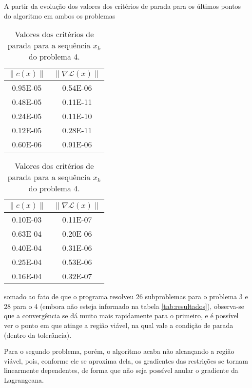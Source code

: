 	A partir da evolução dos valores dos critérios de parada para os últimos pontos
	do algoritmo em ambos os problemas
	\begin{table}[h!]
		\centering
		\begin{minipage}{.45\linewidth}
			\centering
			\begin{tabular}{cc}
				$\| c(x) \|$ & $\| \nabla \mathcal{L}(x) \|$ \\
				\hline
				0.95E-05 &   0.54E-06 \\
				0.48E-05 &   0.11E-11 \\
				0.24E-05 &   0.11E-10 \\
				0.12E-05 &   0.28E-11 \\
				0.60E-06 &   0.91E-06 \\
			\end{tabular}
			\caption{Valores dos critérios de parada para a sequência $x_k$ do problema 3.}
		\end{minipage}%
		\hspace{0.1\linewidth}%
		\begin{minipage}[r]{.45\linewidth}
			\centering
			\begin{tabular}{cc}
				$\| c(x) \|$ & $\| \nabla \mathcal{L}(x) \|$ \\
				\hline
				0.10E-03 &   0.11E-07 \\
				0.63E-04 &   0.20E-06 \\
				0.40E-04 &   0.31E-06 \\
				0.25E-04 &   0.53E-06 \\
				0.16E-04 &   0.32E-07 \\
			\end{tabular}
			\caption{Valores dos critérios de parada para a sequência $x_k$ do problema 4.}
		\end{minipage}
	\end{table}

	somado ao fato de que o programa resolveu 26 subproblemas para o problema 3 e
	28 para o 4 (embora não esteja informado na tabela \ref{tab:resultados}),
	observa-se que a convergência se dá muito mais rapidamente para o primeiro,
	e é possível ver o ponto em que atinge a região viável, na qual vale a condição
	de parada (dentro da tolerância).

	Para o segundo problema, porém, o algoritmo
	acaba não alcançando a região viável, pois, conforme ele se aproxima dela,
	os gradientes das restrições se tornam linearmente dependentes, de forma que
	não seja possível anular o gradiente da Lagrangeana.
